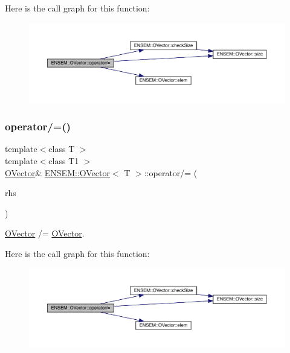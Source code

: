 Here is the call graph for this function\+:
\nopagebreak
\begin{figure}[H]
\begin{center}
\leavevmode
\includegraphics[width=350pt]{d0/d8d/classENSEM_1_1OVector_a61d1911393adf46629dd493ef09c1022_cgraph}
\end{center}
\end{figure}
\mbox{\label{classENSEM_1_1OVector_a61d1911393adf46629dd493ef09c1022}} 
\subsubsection{\texorpdfstring{operator/=()}{operator/=()}\hspace{0.1cm}{\footnotesize\ttfamily [4/4]}}
{\footnotesize\ttfamily template$<$class T $>$ \\
template$<$class T1 $>$ \\
\mbox{\hyperlink{classENSEM_1_1OVector}{O\+Vector}}\& \mbox{\hyperlink{classENSEM_1_1OVector}{E\+N\+S\+E\+M\+::\+O\+Vector}}$<$ T $>$\+::operator/= (\begin{DoxyParamCaption}\item[{const \mbox{\hyperlink{classENSEM_1_1OVector}{O\+Vector}}$<$ T1 $>$ \&}]{rhs }\end{DoxyParamCaption})\hspace{0.3cm}{\ttfamily [inline]}}



\mbox{\hyperlink{classENSEM_1_1OVector}{O\+Vector}} /= \mbox{\hyperlink{classENSEM_1_1OVector}{O\+Vector}}. 

Here is the call graph for this function\+:
\nopagebreak
\begin{figure}[H]
\begin{center}
\leavevmode
\includegraphics[width=350pt]{d0/d8d/classENSEM_1_1OVector_a61d1911393adf46629dd493ef09c1022_cgraph}
\end{center}
\end{figure}
\mbox{\label{classENSEM_1_1OVector_a54123bea722ddb2b3eaea0c948735b13}} 
